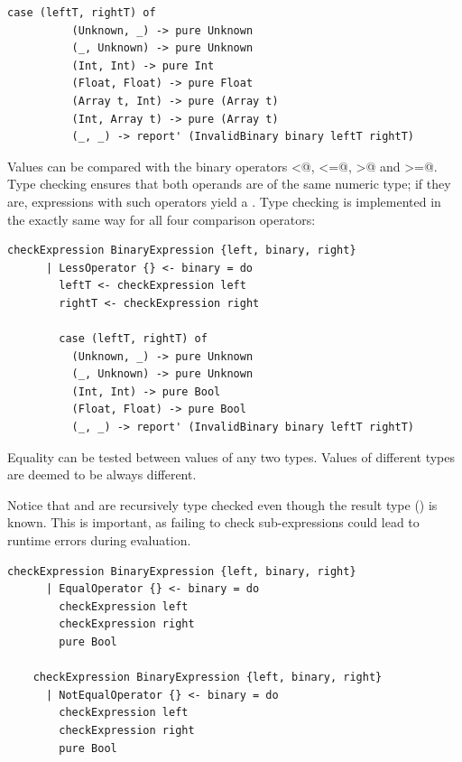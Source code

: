 \documentclass[UdineBachThesis,american,11pt]{PhdThesis}
\begin{document}
  \newpage

  \begin{lstlisting}[gobble=4,basicstyle=\ttfamily\small]
        case (leftT, rightT) of
          (Unknown, _) -> pure Unknown
          (_, Unknown) -> pure Unknown
          (Int, Int) -> pure Int
          (Float, Float) -> pure Float
          (Array t, Int) -> pure (Array t)
          (Int, Array t) -> pure (Array t)
          (_, _) -> report' (InvalidBinary binary leftT rightT)
  \end{lstlisting}

  Values can be compared with the binary operators \lstinline@<@,
  \lstinline@<=@, \lstinline@>@ and \lstinline@>=@. Type checking ensures that
  both operands are of the same numeric type; if they are, expressions with such
  operators yield a \lstinline@Bool@. Type checking is implemented in the
  exactly same way for all four comparison operators:

  \begin{lstlisting}[gobble=4,basicstyle=\ttfamily\small]
    checkExpression BinaryExpression {left, binary, right}
      | LessOperator {} <- binary = do
        leftT <- checkExpression left
        rightT <- checkExpression right

        case (leftT, rightT) of
          (Unknown, _) -> pure Unknown
          (_, Unknown) -> pure Unknown
          (Int, Int) -> pure Bool
          (Float, Float) -> pure Bool
          (_, _) -> report' (InvalidBinary binary leftT rightT)
  \end{lstlisting}

  Equality can be tested between values of any two types. Values of different
  types are deemed to be always different.

  Notice that \lstinline@left@ and \lstinline@right@ are recursively type
  checked even though the result type (\lstinline@Bool@) is known. This is
  important, as failing to check sub-expressions could lead to runtime errors
  during evaluation.

  \begin{lstlisting}[gobble=4,basicstyle=\ttfamily\small]
    checkExpression BinaryExpression {left, binary, right}
      | EqualOperator {} <- binary = do
        checkExpression left
        checkExpression right
        pure Bool

    checkExpression BinaryExpression {left, binary, right}
      | NotEqualOperator {} <- binary = do
        checkExpression left
        checkExpression right
        pure Bool
  \end{lstlisting}
\end{document}
